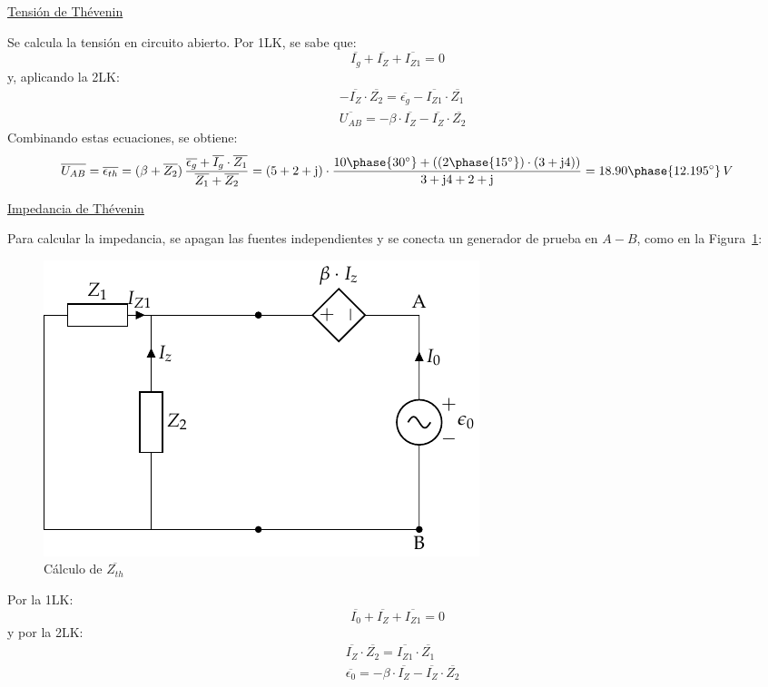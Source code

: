 \begin{example}
\underline{Tensión de Thévenin}

Se calcula la tensión en circuito abierto. Por 1LK, se sabe que:
\begin{equation*}
    \overline{I_g} + \overline{I_Z} + \overline{I_{Z1}} = 0 
\end{equation*}
y, aplicando la 2LK: 
\begin{align*}
    &- \overline{I_Z} \cdot \overline{Z_2} = \overline{\epsilon_g} - \overline{I_{Z1}} \cdot \overline{Z_1}\\
   &\overline{U_{AB}} = - \beta \cdot \overline{I_Z} - \overline{I_Z} \cdot \overline{Z_2}
\end{align*}
Combinando estas ecuaciones, se obtiene:
\begin{equation*}
  \overline{U_{AB}}=\overline{\epsilon_{th}} = (\beta + \overline{Z_2}) \, \dfrac{\overline{\epsilon_g} + \overline{I_g} \cdot \overline{Z_1}}{\overline{Z_1} + \overline{Z_2}} = (5+2+\mathrm{j})\cdot\dfrac{10\phase{30^\circ}+((2\phase{15^\circ})\cdot (3+\mathrm{j}4))}{3 + \mathrm{j}4+2 + \mathrm{j}}= 18.90\phase{12.195^\circ}\,V 
\end{equation*}

\underline{Impedancia de Thévenin}

Para calcular la impedancia, se apagan las fuentes independientes y se conecta un generador de prueba en $A-B$, como en la Figura~\ref{fig.thevenin6_zth}:
\begin{figure}[H]
    \centering
    \includegraphics[width=0.5\linewidth]{../figs/thevenin6_fuenteprueba.pdf}
    \caption{Cálculo de $\overline{Z_{th}}$}
    \label{fig.thevenin6_zth}
\end{figure}

Por la 1LK:
\begin{equation*}
    \overline{I_0} + \overline{I_Z} + \overline{I_{Z1}} = 0
\end{equation*}
y por la 2LK:
\begin{align*}
    &\overline{I_Z} \cdot \overline{Z_2} = \overline{I_{Z1}} \cdot \overline{Z_1}\\
    &\overline{\epsilon_0} = - \beta \cdot \overline{I_Z} - \overline{I_Z} \cdot \overline{Z_2}
  \end{align*}


\end{example}
